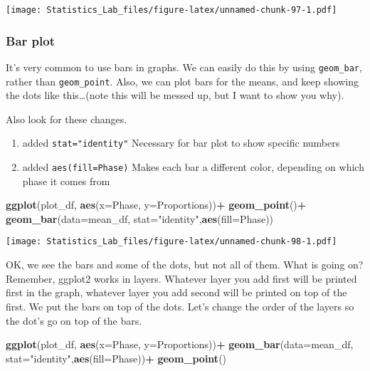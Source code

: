 \documentclass[
]{book}
\newenvironment{Shaded}{\begin{snugshade}}{\end{snugshade}}
\newcommand{\AttributeTok}[1]{\textcolor[rgb]{0.13,0.29,0.53}{#1}}
\newcommand{\FunctionTok}[1]{\textcolor[rgb]{0.13,0.29,0.53}{\textbf{#1}}}
\newcommand{\NormalTok}[1]{#1}
\newcommand{\SpecialCharTok}[1]{\textcolor[rgb]{0.81,0.36,0.00}{\textbf{#1}}}
\newcommand{\StringTok}[1]{\textcolor[rgb]{0.31,0.60,0.02}{#1}}
\providecommand{\tightlist}{%
  \setlength{\itemsep}{0pt}\setlength{\parskip}{0pt}}
\begin{document}
\texttt{[image: Statistics\_Lab\_files/figure-latex/unnamed-chunk-97-1.pdf]}

\hypertarget{bar-plot}{%
\subsubsection{Bar plot}\label{bar-plot}}

It's very common to use bars in graphs. We can easily do this by using \texttt{geom\_bar}, rather than \texttt{geom\_point}. Also, we can plot bars for the means, and keep showing the dots like this\ldots(note this will be messed up, but I want to show you why).

Also look for these changes.

\begin{enumerate}
\def\labelenumi{\arabic{enumi}.}
\tightlist
\item
  added \texttt{stat="identity"} Necessary for bar plot to show specific numbers
\item
  added \texttt{aes(fill=Phase)} Makes each bar a different color, depending on which phase it comes from
\end{enumerate}

\begin{Shaded}
\begin{Highlighting}[]
\FunctionTok{ggplot}\NormalTok{(plot\_df, }\FunctionTok{aes}\NormalTok{(}\AttributeTok{x=}\NormalTok{Phase, }\AttributeTok{y=}\NormalTok{Proportions))}\SpecialCharTok{+} 
  \FunctionTok{geom\_point}\NormalTok{()}\SpecialCharTok{+}
  \FunctionTok{geom\_bar}\NormalTok{(}\AttributeTok{data=}\NormalTok{mean\_df, }\AttributeTok{stat=}\StringTok{"identity"}\NormalTok{,}\FunctionTok{aes}\NormalTok{(}\AttributeTok{fill=}\NormalTok{Phase))}
\end{Highlighting}
\end{Shaded}

\texttt{[image: Statistics\_Lab\_files/figure-latex/unnamed-chunk-98-1.pdf]}

OK, we see the bars and some of the dots, but not all of them. What is going on? Remember, ggplot2 works in layers. Whatever layer you add first will be printed first in the graph, whatever layer you add second will be printed on top of the first. We put the bars on top of the dots. Let's change the order of the layers so the dot's go on top of the bars.

\begin{Shaded}
\begin{Highlighting}[]
\FunctionTok{ggplot}\NormalTok{(plot\_df, }\FunctionTok{aes}\NormalTok{(}\AttributeTok{x=}\NormalTok{Phase, }\AttributeTok{y=}\NormalTok{Proportions))}\SpecialCharTok{+} 
  \FunctionTok{geom\_bar}\NormalTok{(}\AttributeTok{data=}\NormalTok{mean\_df, }\AttributeTok{stat=}\StringTok{"identity"}\NormalTok{,}\FunctionTok{aes}\NormalTok{(}\AttributeTok{fill=}\NormalTok{Phase))}\SpecialCharTok{+}
  \FunctionTok{geom\_point}\NormalTok{()}
\end{Highlighting}
\end{Shaded}
\end{document}
